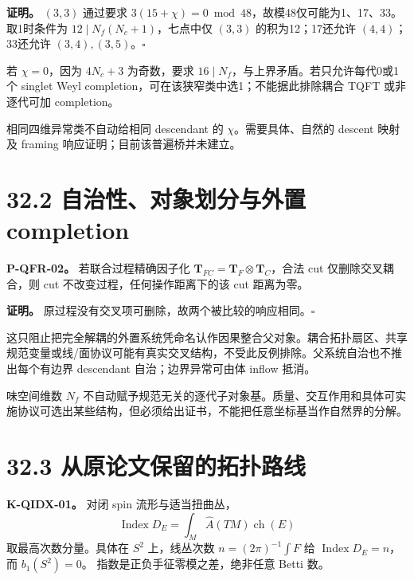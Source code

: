 \documentclass[
  11pt,
  oneside]{book}
\begin{document}
\textbf{证明。} \((3,3)\) 通过要求
\(3(15+\chi)=0\bmod48\)，故模48仅可能为1、17、33。取1时条件为
\(12\mid N_f(N_c+1)\)，七点中仅 \((3,3)\) 的积为12；17还允许
\((4,4)\)；33还允许 \((3,4),(3,5)\)。\(\square\)

若 \(\chi=0\)，因为 \(4N_c+3\) 为奇数，要求
\(16\mid N_f\)，与上界矛盾。若只允许每代0或1个 singlet Weyl
completion，可在该狭窄类中选1；不能据此排除耦合 TQFT 或非逐代可加
completion。

相同四维异常类不自动给相同 descendant 的 \(\chi\)。需要具体、自然的
descent 映射及 framing 响应证明；目前该普遍桥并未建立。

\hypertarget{ux81eaux6cbbux6027ux5bf9ux8c61ux5212ux5206ux4e0eux5916ux7f6e-completion}{%
\section{32.2 自治性、对象划分与外置
completion}\label{ux81eaux6cbbux6027ux5bf9ux8c61ux5212ux5206ux4e0eux5916ux7f6e-completion}}

\protect\hypertarget{p-qfr-02}{}{}

\textbf{P-QFR-02。} 若联合过程精确因子化
\(\mathbf T_{FC}=\mathbf T_F\otimes\mathbf T_C\)，合法 cut
仅删除交叉耦合，则 cut 不改变过程，任何操作距离下的该 cut 距离为零。

\textbf{证明。}
原过程没有交叉项可删除，故两个被比较的响应相同。\(\square\)

这只阻止把完全解耦的外置系统凭命名认作因果整合父对象。耦合拓扑扇区、共享规范变量或线/面协议可能有真实交叉结构，不受此反例排除。父系统自治也不推出每个有边界
descendant 自治；边界异常可由体 inflow 抵消。

味空间维数 \(N_f\)
不自动赋予规范无关的逐代子对象基。质量、交互作用和具体可实施协议可选出某些结构，但必须给出证书，不能把任意坐标基当作自然界的分解。

\hypertarget{ux4eceux539fux8bbaux6587ux4fddux7559ux7684ux62d3ux6251ux8defux7ebf}{%
\section{32.3
从原论文保留的拓扑路线}\label{ux4eceux539fux8bbaux6587ux4fddux7559ux7684ux62d3ux6251ux8defux7ebf}}

\textbf{K-QIDX-01。} 对闭 spin 流形与适当扭曲丛， \[
\operatorname{Index}D_E=\int_M\widehat A(TM)\operatorname{ch}(E)
\] 取最高次数分量。具体在 \(S^2\) 上，线丛次数 \(n=(2\pi)^{-1}\int F\)
给 \(\operatorname{Index}D_E=n\)，而 \(b_1(S^2)=0\)。
指数是正负手征零模之差，绝非任意 Betti 数。
\end{document}

